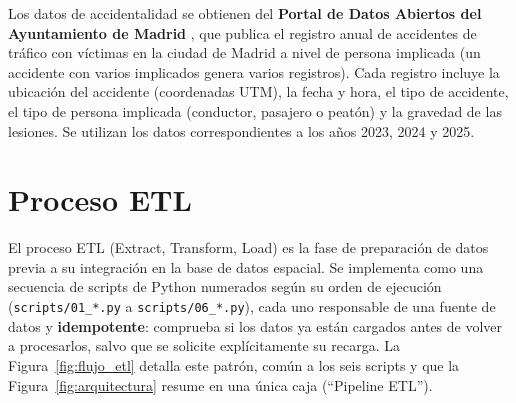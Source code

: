 Los datos de accidentalidad se obtienen del \textbf{Portal de Datos Abiertos del Ayuntamiento de Madrid} \cite{madridopendata}, que publica el registro anual de accidentes de tráfico con víctimas en la ciudad de Madrid a nivel de persona implicada (un accidente con varios implicados genera varios registros). Cada registro incluye la ubicación del accidente (coordenadas UTM), la fecha y hora, el tipo de accidente, el tipo de persona implicada (conductor, pasajero o peatón) y la gravedad de las lesiones. Se utilizan los datos correspondientes a los años 2023, 2024 y 2025.

\section{Proceso ETL}
\label{sec:etl}

El proceso ETL (Extract, Transform, Load) es la fase de preparación de datos previa a su integración en la base de datos espacial. Se implementa como una secuencia de scripts de Python numerados según su orden de ejecución (\texttt{scripts/01\_*.py} a \texttt{scripts/06\_*.py}), cada uno responsable de una fuente de datos y \textbf{idempotente}: comprueba si los datos ya están cargados antes de volver a procesarlos, salvo que se solicite explícitamente su recarga. La Figura~\ref{fig:flujo_etl} detalla este patrón, común a los seis scripts y que la Figura~\ref{fig:arquitectura} resume en una única caja (``Pipeline ETL'').

